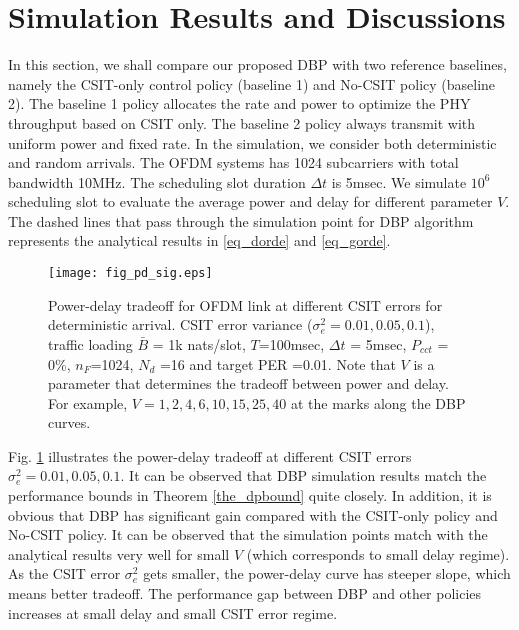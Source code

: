 \documentclass[11pt,journal, onecolumn]{./IEEEtran}
\newcommand{\black}{\color{black}}
\newcommand{\red}{\color{black}}
\begin{document}
\section{Simulation Results and Discussions}

In this section, we shall compare our proposed DBP with two reference baselines, namely the CSIT-only control policy (baseline 1) and No-CSIT policy (baseline 2). The baseline 1 policy allocates the rate and power to optimize the PHY throughput based on CSIT only. The baseline 2 policy always transmit with uniform power and fixed rate. In the simulation, we consider both deterministic and random arrivals. The OFDM systems has 1024 subcarriers with total bandwidth 10MHz. The scheduling slot duration $\Delta t$ is 5msec. {\red We simulate $10^6$ scheduling slot to evaluate the average power and delay for different parameter $V$. The dashed lines that pass through the simulation point for DBP algorithm represents the analytical results in \eqref{eq_dorde} and \eqref{eq_gorde}.}

\begin{figure}[t!]
\centering
\texttt{[image: fig\_pd\_sig.eps]}
\caption{{\red Power-delay tradeoff for OFDM link at different CSIT errors for deterministic arrival. CSIT error variance ($\sigma_e^2 = 0.01, 0.05, 0.1$), traffic loading $\bar B$ = 1k nats/slot, $T$=100msec, $\Delta t$ = 5msec, $P_{cct}$ = 0\%, $n_F$=1024, $N_d$ =16 and target PER =0.01. Note that $V$ is a parameter that determines the tradeoff between power and delay. For example, $V=1,2,4, 6,10, 15,25,40$ at the marks along the DBP curves. } \black } \label{fig_pd_sig} \black
\end{figure}

\black

Fig. \ref{fig_pd_sig} illustrates the power-delay tradeoff at different CSIT errors $\sigma^2_e=0.01,0.05,0.1$. It can be observed that DBP simulation results match the performance bounds in Theorem \ref{the_dpbound} quite closely. In addition, it is obvious that DBP has significant gain compared with the CSIT-only policy and No-CSIT policy. {\red It can be observed that the simulation points match with the analytical results very well for small $V$ (which corresponds to small delay regime).} As the CSIT error $\sigma^2_e$ gets smaller, the power-delay curve has steeper slope, which means better tradeoff. The performance gap between DBP and other policies increases at small delay and small CSIT error regime.
\end{document}
